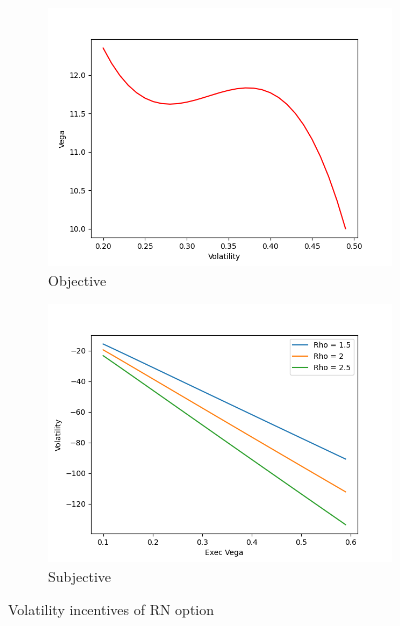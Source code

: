 \vspace*{15pt}
\begin{figure}[H]
    \centering
    \begin{subfigure}{0.45\textwidth}
        \centering
        \includegraphics[width=\textwidth]{fig/4/vega_obj.png}
        \caption{Objective}
        \label{fig:rn_vega_obj}
    \end{subfigure}
    \hfill
    \begin{subfigure}{0.45\textwidth}
        \centering
        \includegraphics[width=\textwidth]{fig/4/vega_subj.png}
        \caption{Subjective}
        \label{fig:rn_vega_subj}
    \end{subfigure}
    \caption{Volatility incentives of RN option}
    \label{fig:rn_vega_both}
\end{figure}
\vspace*{15pt}

